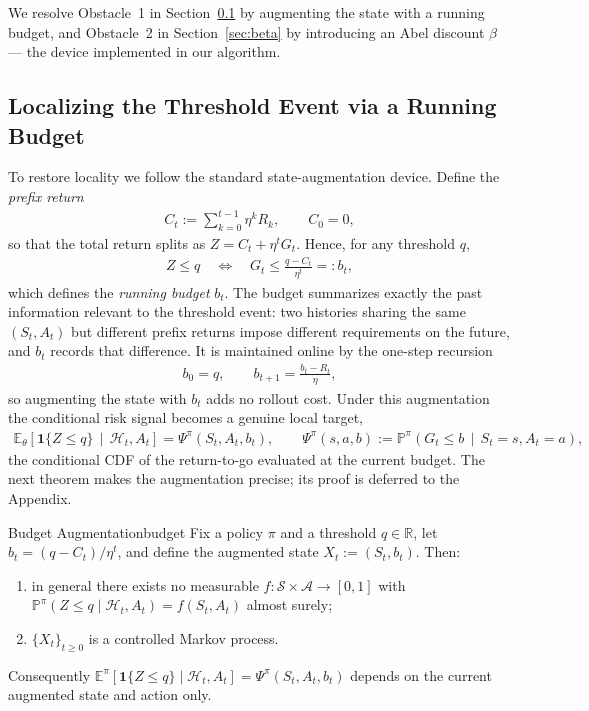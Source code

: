 We resolve Obstacle~1 in Section~\ref{sec:budget} by augmenting the state with a running budget, and Obstacle~2 in Section~\ref{sec:beta} by introducing an Abel discount $\beta$ --- the device implemented in our algorithm.

\subsection{Localizing the Threshold Event via a Running Budget}\label{sec:budget}
To restore locality we follow the standard state-augmentation device. Define the \emph{prefix return}
\begin{align}
    C_t
    :=
    \sum_{k=0}^{t-1}\eta^k R_k,
    \qquad
    C_0=0,
\end{align}
so that the total return splits as $Z=C_t+\eta^t G_t$. Hence, for any threshold $q$,
\begin{align}
    Z\le q
    \quad\Longleftrightarrow\quad
    G_t\le\frac{q-C_t}{\eta^t}
    =:b_t,
\end{align}
which defines the \emph{running budget} $b_t$. The budget summarizes exactly the past information relevant to the threshold event: two histories sharing the same $(S_t,A_t)$ but different prefix returns impose different requirements on the future, and $b_t$ records that difference. It is maintained online by the one-step recursion
\begin{align}\label{eq:budget_rec}
    b_0=q,
    \qquad
    b_{t+1}=\frac{b_t-R_t}{\eta},
\end{align}
so augmenting the state with $b_t$ adds no rollout cost. Under this augmentation the conditional risk signal becomes a genuine local target,
\begin{align}\label{eq:psi_target}
    \mathbb{E}_{\theta}\!\left[\mathbf{1}\{Z\le q\}\,\middle|\,\mathcal{H}_t,A_t\right]
    =
    \Psi^{\pi}(S_t,A_t,b_t),
    \qquad
    \Psi^{\pi}(s,a,b):=\mathbb{P}^{\pi}\!\left(G_t\le b\,\middle|\,S_t=s,A_t=a\right),
\end{align}
the conditional CDF of the return-to-go evaluated at the current budget. The next theorem makes the augmentation precise; its proof is deferred to the Appendix.

\begin{theorem}{Budget Augmentation}{budget}
Fix a policy $\pi$ and a threshold $q\in\mathbb{R}$, let $b_t=(q-C_t)/\eta^t$, and define the augmented state $X_t:=(S_t,b_t)$. Then:
\begin{enumerate}
    \item[(i)] in general there exists no measurable $f:\mathcal{S}\times\mathcal{A}\to[0,1]$ with $\mathbb{P}^{\pi}(Z\le q\mid\mathcal{H}_t,A_t)=f(S_t,A_t)$ almost surely;
    \item[(ii)] $\{X_t\}_{t\ge0}$ is a controlled Markov process.
\end{enumerate}
Consequently $\mathbb{E}^{\pi}[\mathbf{1}\{Z\le q\}\mid\mathcal{H}_t,A_t]=\Psi^{\pi}(S_t,A_t,b_t)$ depends on the current augmented state and action only.
\end{theorem}

